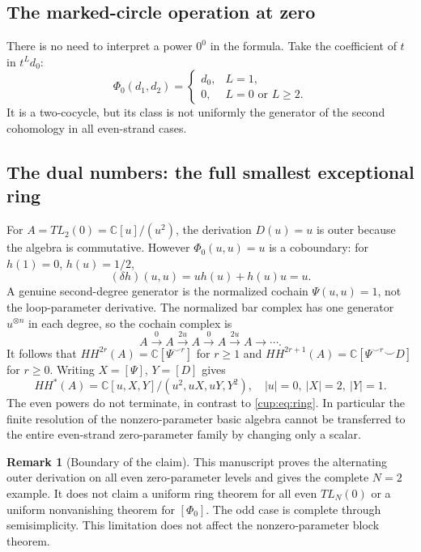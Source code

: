 \documentclass[a4paper,11pt,oneside,reqno]{amsart}
\theoremstyle{definition}
\newtheorem{remark}[theorem]{Remark}
\numberwithin{equation}{section}
\begin{document}
	\subsection{The marked-circle operation at zero}
	There is no need to interpret a power $0^0$ in the formula.  Take
	the coefficient of $t$ in $t^Ld_0$:
	\begin{equation}\label{tl:Phizero}
		\Phi_0(d_1,d_2)=
		\begin{cases}d_0,&L=1,\\0,&L=0\text{ or }L\ge2.\end{cases}
	\end{equation}
	It is a two-cocycle, but its class is not uniformly the generator
	of the second cohomology in all even-strand cases.
	
	\subsection{The dual numbers: the full smallest exceptional ring}
	For $A=TL_2(0)=\mathbb C[u]/(u^2)$, the derivation $D(u)=u$ is
	outer because the algebra is commutative.  However
	$\Phi_0(u,u)=u$ is a coboundary: for $h(1)=0$, $h(u)=1/2$,
	\[
	(\delta h)(u,u)=uh(u)+h(u)u=u.
	\]
	A genuine second-degree generator is the normalized cochain
	$\Psi(u,u)=1$, not the loop-parameter derivative.
	The normalized bar complex has one generator $u^{\otimes n}$ in
	each degree, so the cochain complex is
	\[
	A\xrightarrow{0}A\xrightarrow{2u}A\xrightarrow{0}A
	\xrightarrow{2u}A\longrightarrow\cdots.
	\]
	It follows that $HH^{2r}(A)=\mathbb C[\Psi^{\smile r}]$ for
	$r\ge1$ and $HH^{2r+1}(A)=\mathbb C[\Psi^{\smile r}\smile D]$
	for $r\ge0$.  Writing $X=[\Psi]$, $Y=[D]$ gives
	\begin{equation}\label{tl:dualnumbers-ring}
		HH^*(A)=\mathbb C[u,X,Y]/(u^2,uX,uY,Y^2),
		\quad |u|=0,\ |X|=2,\ |Y|=1.
	\end{equation}
	The even powers do not terminate, in contrast to
	\eqref{cup:eq:ring}.  In particular the finite resolution of the
	nonzero-parameter basic algebra cannot be transferred to the entire
	even-strand zero-parameter family by changing only a scalar.
	
	\begin{remark}[Boundary of the claim]
		This manuscript proves the alternating outer derivation on all even
		zero-parameter levels and gives the complete $N=2$ example.  It does
		not claim a uniform ring theorem for all even $TL_N(0)$ or a
		uniform nonvanishing theorem for $[\Phi_0]$.  The odd case is
		complete through semisimplicity.  This limitation does not affect the
		nonzero-parameter block theorem.
	\end{remark}
	
\end{document}
